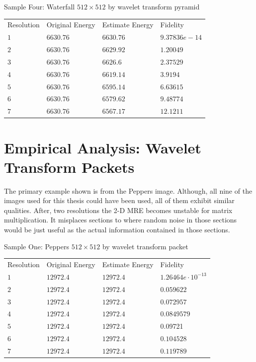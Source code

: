 

Sample Four: Waterfall $512 \times 512$ by wavelet transform pyramid 

\begin{tabular}{llll}
{ Resolution} & { Original Energy }& { 
Estimate Energy } &  { 
Fidelity } \\ 
$1$&  $6630.76$ & $6630.76$&  $9.37836e-14$ \\ 
$2$& $6630.76$ & $6629.92$  &  $1.20049$ \\ 
$3$& $6630.76$ & $6626.6$   & $2.37529$ \\ 
$4$& $6630.76$ & $6619.14$  & $3.9194$ \\ 
$5$& $6630.76$ & $6595.14$  &  $6.63615$\\ 
$6$& $6630.76$ & $6579.62$  & $9.48774$ \\ 
$7$& $6630.76$ & $6567.17$  &  $12.1211$
\end{tabular}

\section {Empirical Analysis: Wavelet Transform Packets}
The primary example shown is from the Peppers image.  Although, all nine of the images used for this thesis could have been used, all of them exhibit similar qualities.   After, two resolutions the 2-D MRE becomes unstable for matrix multiplication.  It misplaces sections to where random noise in those sections would be just useful as the actual information contained in those sections.  

Sample One: Peppers $512 \times 512$ by wavelet transform packet 

\begin{tabular}{llll}
{ Resolution } &  {Original Energy }  &{ Estimate Energy }  & {Fidelity} \\ 
$1$ & $12972.4$ &  $12972.4$ &  $1.26464e \cdot 10^{-13}$\\ 
$2$ & $12972.4$ & $12972.4$ &  $0.059622$ \\ 
$3$ & $12972.4$ & $12972.4$ &  $0.072957$  \\ 
$4$& $12972.4$  & $12972.4$  & $0.0849579$  \\ 

$5$& $12972.4$  & $12972.4$  & 0.09721  \\ 

$6$& $12972.4$  & $12972.4$ &  $0.104528$  \\ 

$7$& $12972.4$  & $12972.4$ &  $0.119789$  \\ 

\end{tabular}

